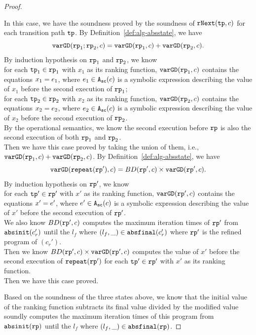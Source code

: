 \begin{proof}
\begin{itemize}
\[\]
In this case, we have the soundness proved by the soundness of $\mathtt{rNext}(\mathtt{tp}, c)$ for each transition path $\mathtt{tp}$.
 By Definition~\ref{def:alg-absstate}, we have
\[
\mathtt{varGD}(\mathtt{rp}_1;\mathtt{rp}_2, c) =  \mathtt{varGD}(\mathtt{rp}_1, c) + \mathtt{varGD}(\mathtt{rp}_2, c).
\]
By induction hypothesis on $\mathtt{rp}_1$ and $\mathtt{rp}_2$, we know
\\
for each $\mathtt{tp}_1 \in \mathtt{rp}_1$ with $x_1$ as its ranking function,
$\mathtt{varGD}(\mathtt{rp}_1, c)$ contains the equations $x_1 = e_1$, where $e_1 \in {\ensuremath{\mathtt{A_{sc}}}}(c)$ is a
symbolic expression describing the value of $x_1$ before the second execution of $\mathtt{rp}_1$;
\\
for each $\mathtt{tp}_2 \in \mathtt{rp}_2$ with $x_2$ as its ranking function,
$\mathtt{varGD}(\mathtt{rp}_2, c)$ contains the equations $x_2 = e_2$, where $e_2 \in {\ensuremath{\mathtt{A_{sc}}}}(c)$ is a
symbolic expression describing the value of $x_2$ before the second execution of $\mathtt{rp}_2$.
\\
By the operational semantics, we know the second execution before $\mathtt{rp}$ is also the second execution of both $\mathtt{rp}_1$ and $\mathtt{rp}_2$.
\\
Then we have this case proved by taking the union of them, i.e., $\mathtt{varGD}(\mathtt{rp}_1, c) + \mathtt{varGD}(\mathtt{rp}_2, c)$.
 By Definition~\ref{def:alg-absstate}, we have
\[
  \mathtt{varGD}(\mathtt{repeat}(\mathtt{rp}'), c) =  BD(\mathtt{rp}', c)  \times
  {\ensuremath{\mathtt{varGD}}(\ensuremath{\mathtt{rp}}', c)}.
\]
By induction hypothesis on $\mathtt{rp}'$, we know
\\
for each $\mathtt{tp}' \in \mathtt{rp}'$ with $x'$ as its ranking function,
$\mathtt{varGD}(\mathtt{rp}', c)$ contains the equations $x' = e'$, where $e' \in {\ensuremath{\mathtt{A_{sc}}}}(c)$ is a
symbolic expression describing the value of $x'$ before the second execution of $\mathtt{rp}'$.
\\
We also know $BD(\mathtt{rp}', c)$ computes the maximum iteration times of $\mathtt{rp}'$ from $\mathtt{abs}{\mathtt{init}}(c_r')$ until the $l_f$ where $(l_f, \_) \in \mathtt{abs}{\mathtt{final}}(c_r')$ where $\mathtt{rp}'$ is the refined program of
$(c_r')$.
\\
Then we know $BD(\mathtt{rp}', c)  \times
{\ensuremath{\mathtt{varGD}}(\ensuremath{\mathtt{rp}}', c)}$
computes the value of $x'$ before the second execution of $\mathtt{repeat}(\mathtt{rp}')$ for each $\mathtt{tp}' \in \mathtt{rp}'$ with $x'$ as its ranking function.
\\
Then we have this case proved.
\end{itemize}
Based on the soundness of the three states above, we know that the initial value of the ranking function
subtracts its final value divided by the modified value soundly computes the maximum iteration times of this program from $\mathtt{abs}{\mathtt{init}}(\mathtt{rp})$ until the $l_f$ where $(l_f, \_) \in \mathtt{abs}{\mathtt{final}}(\mathtt{rp})$.

\end{proof}
